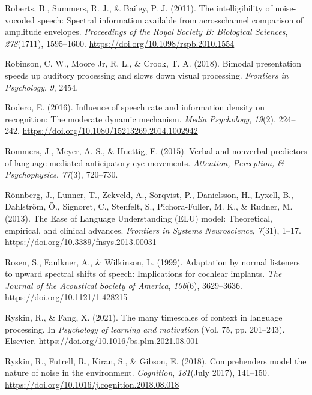 \documentclass[a4paper, nobind]{templates/ociamthesis}
\newlength{\cslhangindent}
\newenvironment{CSLReferences}[2] %
 {%
  \setlength{\parindent}{0pt}
  \ifodd #1
  \let\oldpar\par
  \def\par{\hangindent=\cslhangindent\oldpar}
  \fi
  \setlength{\parskip}{1mm}
  \setlength{\baselineskip}{6mm}
 }%
 {}
\begin{document}
\begin{CSLReferences}{1}{0}
\leavevmode{}%
Roberts, B., Summers, R. J., \& Bailey, P. J. (2011). The intelligibility of noise-vocoded speech: Spectral information available from acrosschannel comparison of amplitude envelopes. \emph{Proceedings of the Royal Society B: Biological Sciences}, \emph{278}(1711), 1595--1600. \url{https://doi.org/10.1098/rspb.2010.1554}

\leavevmode{}%
Robinson, C. W., Moore Jr, R. L., \& Crook, T. A. (2018). Bimodal presentation speeds up auditory processing and slows down visual processing. \emph{Frontiers in Psychology}, \emph{9}, 2454.

\leavevmode{}%
Rodero, E. (2016). {Influence of speech rate and information density on recognition: The moderate dynamic mechanism}. \emph{Media Psychology}, \emph{19}(2), 224--242. \url{https://doi.org/10.1080/15213269.2014.1002942}

\leavevmode{}%
Rommers, J., Meyer, A. S., \& Huettig, F. (2015). Verbal and nonverbal predictors of language-mediated anticipatory eye movements. \emph{Attention, Perception, \& Psychophysics}, \emph{77}(3), 720--730.

\leavevmode{}%
Rönnberg, J., Lunner, T., Zekveld, A., Sörqvist, P., Danielsson, H., Lyxell, B., Dahlström, Ö., Signoret, C., Stenfelt, S., Pichora-Fuller, M. K., \& Rudner, M. (2013). {The Ease of Language Understanding (ELU) model: Theoretical, empirical, and clinical advances}. \emph{Frontiers in Systems Neuroscience}, \emph{7}(31), 1--17. \url{https://doi.org/10.3389/fnsys.2013.00031}

\leavevmode{}%
Rosen, S., Faulkner, A., \& Wilkinson, L. (1999). Adaptation by normal listeners to upward spectral shifts of speech: Implications for cochlear implants. \emph{The Journal of the Acoustical Society of America}, \emph{106}(6), 3629--3636. \url{https://doi.org/10.1121/1.428215}

\leavevmode{}%
Ryskin, R., \& Fang, X. (2021). The many timescales of context in language processing. In \emph{Psychology of learning and motivation} (Vol. 75, pp. 201--243). Elsevier. \url{https://doi.org/10.1016/bs.plm.2021.08.001}

\leavevmode{}%
Ryskin, R., Futrell, R., Kiran, S., \& Gibson, E. (2018). {Comprehenders model the nature of noise in the environment}. \emph{Cognition}, \emph{181}(July 2017), 141--150. \url{https://doi.org/10.1016/j.cognition.2018.08.018}


\end{CSLReferences}
\end{document}
